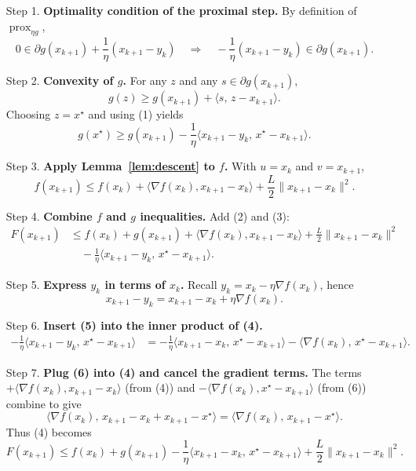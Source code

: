 \documentclass{article}
\begin{document}
\begin{enumerate}
\item[Step 1.] \textbf{Optimality condition of the proximal step.}  
By definition of $\operatorname{prox}_{\eta g}$,
\[
0\in \partial g(x_{k+1})+\frac{1}{\eta}(x_{k+1}-y_{k})
\quad\Longrightarrow\quad
-\frac{1}{\eta}(x_{k+1}-y_{k})\in\partial g(x_{k+1}). \tag{1}
\]

\item[Step 2.] \textbf{Convexity of $g$.}  
For any $z$ and any $s\in\partial g(x_{k+1})$,
\[
g(z)\ge g(x_{k+1})+\langle s,\,z-x_{k+1}\rangle .
\]
Choosing $z=x^{\star}$ and using (1) yields
\[
g(x^{\star})\ge g(x_{k+1})-\frac{1}{\eta}\langle x_{k+1}-y_{k},\,x^{\star}-x_{k+1}\rangle . \tag{2}
\]

\item[Step 3.] \textbf{Apply Lemma~\ref{lem:descent} to $f$.}  
With $u=x_{k}$ and $v=x_{k+1}$,
\[
f(x_{k+1})\le f(x_{k})+\langle\nabla f(x_{k}),x_{k+1}-x_{k}\rangle+\frac{L}{2}\|x_{k+1}-x_{k}\|^{2}. \tag{3}
\]

\item[Step 4.] \textbf{Combine $f$ and $g$ inequalities.}  
Add (2) and (3):
\[
\begin{aligned}
F(x_{k+1}) &\le f(x_{k})+g(x_{k+1})
            +\langle\nabla f(x_{k}),x_{k+1}-x_{k}\rangle
            +\frac{L}{2}\|x_{k+1}-x_{k}\|^{2} \\
           &\quad -\frac{1}{\eta}\langle x_{k+1}-y_{k},\,x^{\star}-x_{k+1}\rangle .
\end{aligned}
\tag{4}
\]

\item[Step 5.] \textbf{Express $y_{k}$ in terms of $x_{k}$.}  
Recall $y_{k}=x_{k}-\eta\nabla f(x_{k})$, hence
\[
x_{k+1}-y_{k}=x_{k+1}-x_{k}+\eta\nabla f(x_{k}). \tag{5}
\]

\item[Step 6.] \textbf{Insert (5) into the inner product of (4).}  
\[
\begin{aligned}
-\frac{1}{\eta}\langle x_{k+1}-y_{k},\,x^{\star}-x_{k+1}\rangle
&= -\frac{1}{\eta}\langle x_{k+1}-x_{k},\,x^{\star}-x_{k+1}\rangle
   -\langle\nabla f(x_{k}),\,x^{\star}-x_{k+1}\rangle .
\end{aligned}
\tag{6}
\]

\item[Step 7.] \textbf{Plug (6) into (4) and cancel the gradient terms.}  
The terms $+\langle\nabla f(x_{k}),x_{k+1}-x_{k}\rangle$ (from (4)) and $-\langle\nabla f(x_{k}),x^{\star}-x_{k+1}\rangle$ (from (6)) combine to give
\[
\langle\nabla f(x_{k}),\,x_{k+1}-x_{k}+x_{k+1}-x^{\star}\rangle
= \langle\nabla f(x_{k}),\,x_{k+1}-x^{\star}\rangle .
\]
Thus (4) becomes
\[
F(x_{k+1})\le f(x_{k})+g(x_{k+1})
            -\frac{1}{\eta}\langle x_{k+1}-x_{k},\,x^{\star}-x_{k+1}\rangle
            +\frac{L}{2}\|x_{k+1}-x_{k}\|^{2}. \tag{7}
\]


\end{enumerate}
\end{document}
